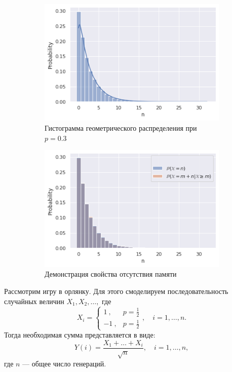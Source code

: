  \begin{figure}
     \centering
     \begin{subfigure}[b]{0.45\textwidth}
         \centering
         \includegraphics[width=\textwidth]{./resources/geometric.png}
         \caption{Гистограмма геометрического распределения при $p = 0.3$}
         \label{fig:geometric_distribution}
     \end{subfigure}
     \hfill
     \begin{subfigure}[b]{0.45\textwidth}
         \centering
         \includegraphics[width=\textwidth]{./resources/comparison.png}
         \caption{Демонстрация свойства отсутствия памяти}
         \label{fig:three sin x}
     \end{subfigure}
     \caption{}
     \label{fig:geometric}
\end{figure}

Рассмотрим игру в орлянку. Для этого смоделируем последовательность
 случайных величин $X_1, X_2, \dots,$ где
\begin{equation}
	X_i = 
	\begin{cases}
	     1 \ , & p = \frac{1}{2}\\
	     -1 \ , & p = \frac{1}{2}
	\end{cases}
     ,\quad i = 1,\dots,n.
\end{equation}
Тогда необходимая сумма представляется в виде:
$$
Y(i) = \dfrac{X_1 + \dots + X_i}{\sqrt n}, \quad
 i = 1,\dots,n ,
$$
где $n$ --- общее число генераций.


